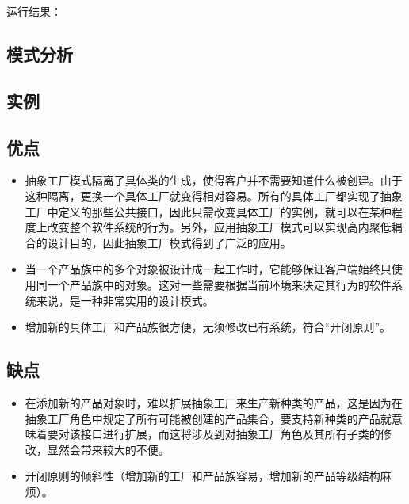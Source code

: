 \documentclass[letterpaper,10pt,english]{sphinxmanual}
\begin{document}
\sphinxAtStartPar
运行结果：

\noindent{}


\subsection{模式分析}
\label{\detokenize{creational_patterns/abstract_factory:id7}}

\subsection{实例}
\label{\detokenize{creational_patterns/abstract_factory:id8}}

\subsection{优点}
\label{\detokenize{creational_patterns/abstract_factory:id9}}\begin{itemize}
\item {} 
\sphinxAtStartPar
抽象工厂模式隔离了具体类的生成，使得客户并不需要知道什么被创建。由于这种隔离，更换一个具体工厂就变得相对容易。所有的具体工厂都实现了抽象工厂中定义的那些公共接口，因此只需改变具体工厂的实例，就可以在某种程度上改变整个软件系统的行为。另外，应用抽象工厂模式可以实现高内聚低耦合的设计目的，因此抽象工厂模式得到了广泛的应用。

\item {} 
\sphinxAtStartPar
当一个产品族中的多个对象被设计成一起工作时，它能够保证客户端始终只使用同一个产品族中的对象。这对一些需要根据当前环境来决定其行为的软件系统来说，是一种非常实用的设计模式。

\item {} 
\sphinxAtStartPar
增加新的具体工厂和产品族很方便，无须修改已有系统，符合“开闭原则”。

\end{itemize}


\subsection{缺点}
\label{\detokenize{creational_patterns/abstract_factory:id10}}\begin{itemize}
\item {} 
\sphinxAtStartPar
在添加新的产品对象时，难以扩展抽象工厂来生产新种类的产品，这是因为在抽象工厂角色中规定了所有可能被创建的产品集合，要支持新种类的产品就意味着要对该接口进行扩展，而这将涉及到对抽象工厂角色及其所有子类的修改，显然会带来较大的不便。

\item {} 
\sphinxAtStartPar
开闭原则的倾斜性（增加新的工厂和产品族容易，增加新的产品等级结构麻烦）。

\end{itemize}
\end{document}
